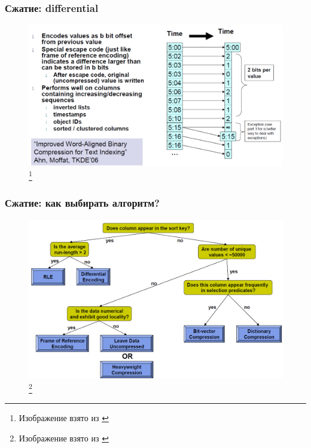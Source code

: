 \documentclass{beamer}
\begin{document}
\begin{frame}
\frametitle{Сжатие: differential}

\begin{figure}[htb]
\includegraphics[width=\textwidth,height=0.75\textheight,keepaspectratio]{compression5.png} 
\footnote{\tiny{Изображение взято из \cite{Harizopoulos2009}}}
 \end{figure}    

\end{frame}

\begin{frame}
\frametitle{Сжатие: как выбирать алгоритм?}

\begin{figure}[htb]
\includegraphics[width=\textwidth,height=0.75\textheight,keepaspectratio]{compression6.png} 
\footnote{\tiny{Изображение взято из \cite{Harizopoulos2009}}}
 \end{figure}    

\end{frame}
\end{document}
